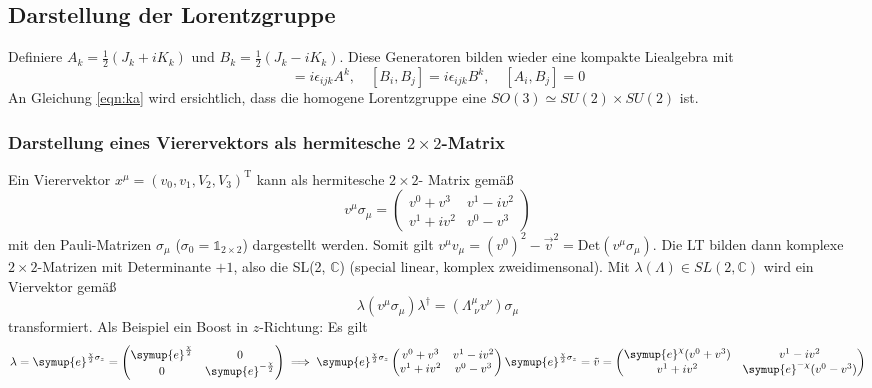 \documentclass[
  captions=tableheading,  %
  titlepage=firstiscover, %
]{scrartcl}
\begin{document}
\subsection{Darstellung der Lorentzgruppe}
Definiere $A_k = \frac{1}{2} (J_k + i K_k)$ und $B_k = \frac{1}{2} (J_k - i K_k)$.
Diese Generatoren bilden wieder eine kompakte Liealgebra mit 
\begin{equation*}
  [A_i,A_j] = i \epsilon_{ijk} A^k, \quad [B_i,B_j] = i \epsilon_{ijk} B^k, \quad [A_i,B_j] = 0 \label{eqn:ka}
\end{equation*}
An Gleichung \eqref{eqn:ka} wird ersichtlich, dass die homogene Lorentzgruppe eine $SO(3) \simeq SU(2) \times SU(2)$
ist. 
\subsubsection{Darstellung eines Vierervektors als hermitesche \texorpdfstring{$2 \times 2$}{PDFstring}-Matrix}
\label{sub:2times2}
Ein Vierervektor $x^{\mu} = (v_0, v_1, V_2, V_3)^\text{T}$ kann als 
hermitesche $2 \times 2$- Matrix gemäß
\begin{equation*}
  v^{\mu} \sigma_{\mu} = 
  \begin{pmatrix}
    v^0 + v^3& v^1 - iv^2 \\
    v^1 + iv^2 & v^0 - v^3
  \end{pmatrix}
\end{equation*}
mit den Pauli-Matrizen $\sigma_{\mu}$ ($\sigma_0 = \mathbb{1}_{2 \times 2}$) dargestellt werden.
Somit gilt $v^{\mu} v_{\mu} = {(v^0)^2 - \vec{v}^2} = \text{Det}(v^{\mu} \sigma_{\mu})$.
Die LT bilden dann komplexe $2\times 2$-Matrizen mit Determinante $+ 1$, also  
die SL(2, $\mathbb{C}$) (special linear, komplex zweidimensonal).
Mit $\lambda(\Lambda) \in SL(2, \mathbb{C})$ wird ein Viervektor gemäß
\begin{equation*}
  \lambda (v^{\mu} \sigma_{\mu}) \lambda^{\dagger} = (\Lambda_{\; \nu}^{\mu} v^{\nu}) \sigma_{\mu}
\end{equation*}
transformiert.
Als Beispiel ein Boost in $z$-Richtung: Es gilt 
\begin{equation*}
  \lambda  = \symup{e}^{\frac{\chi}{2} \sigma_z}
  =
  \begin{pmatrix}
    \symup{e}^{\frac{\chi}{2}} & 0 \\
    0 & \symup{e}^{-\frac{\chi}{2}}
  \end{pmatrix}
  \implies  
  \symup{e}^{\frac{\chi}{2} \sigma_z} 
  \begin{pmatrix}
    v^0 + v^3& v^1 - iv^2 \\
    v^1 + iv^2 & v^0 - v^3
  \end{pmatrix}
  \symup{e}^{\frac{\chi}{2} \sigma_z} 
  = \tilde{v} =
  \begin{pmatrix}
    \symup{e}^{\chi} (v^0 + v^3) & v^1 - iv^2 \\
    v^1 + iv^2 & \symup{e}^{-\chi}(v^0 - v^3)
  \end{pmatrix}
\end{equation*}
\end{document}
